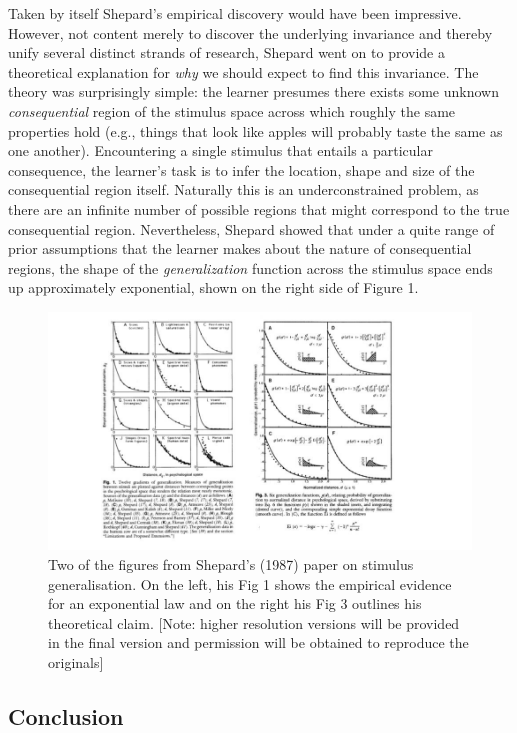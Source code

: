 \documentclass[doc]{apa6}
\begin{document}
Taken by itself Shepard's empirical discovery would have been impressive. However, not content merely to discover the underlying invariance and thereby unify several distinct strands of research, Shepard went on to provide a theoretical explanation for \emph{why} we should expect to find this invariance. The theory was surprisingly simple: the learner presumes there exists some unknown \emph{consequential} region of the stimulus space across which roughly the same properties hold (e.g., things that look like apples will probably taste the same as one another). Encountering a single stimulus that entails a particular consequence, the learner's task is to infer the location, shape and size of the consequential region itself. Naturally this is an underconstrained problem, as there are an infinite number of possible regions that might correspond to the true consequential region. Nevertheless, Shepard showed that under a quite range of prior assumptions that the learner makes about the nature of consequential regions, the shape of the \emph{generalization} function across the stimulus space ends up approximately exponential, shown on the right side of Figure 1.



\begin{figure}
\includegraphics[width=6.4in]{shepard} \caption{Two of the figures from Shepard's (1987) paper on stimulus generalisation. On the left, his Fig 1 shows the empirical evidence for an exponential law and on the right his Fig 3 outlines his theoretical claim. {[}Note: higher resolution versions will be provided in the final version and permission will be obtained to reproduce the originals{]}}\label{fig:unnamed-chunk-1}
\end{figure}

\hypertarget{conclusion}{%
\subsection{Conclusion}\label{conclusion}}
\end{document}
